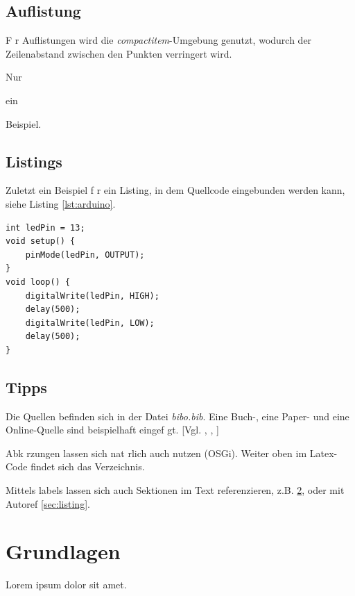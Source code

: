 \documentclass{article}
\begin{document}
\section{Auflistung}
\label{sec:auflistung}
F r Auflistungen wird die \textit{compactitem}-Umgebung genutzt, wodurch der Zeilenabstand zwischen den Punkten verringert wird.

\begin{compactitem}
	\item Nur
	\item ein
	\item Beispiel.
\end{compactitem}

\section{Listings}
\label{sec:listing}
Zuletzt ein Beispiel f r ein Listing, in dem Quellcode eingebunden werden kann, siehe Listing \ref{lst:arduino}.

\vspace{1em}
\begin{lstlisting}[caption=Arduino Beispielprogramm, label=lst:arduino]
int ledPin = 13;
void setup() {
    pinMode(ledPin, OUTPUT);
}
void loop() {
    digitalWrite(ledPin, HIGH);
    delay(500);
    digitalWrite(ledPin, LOW);
    delay(500);
}
\end{lstlisting}

\section{Tipps}
Die Quellen befinden sich in der Datei \textit{bibo.bib}. Eine Buch-, eine Paper- und eine Online-Quelle sind beispielhaft eingef gt. [Vgl. \cite{buch}, \cite{iotbds20}, \cite{online}]

Abk rzungen lassen sich nat rlich auch nutzen (\ac{OSGi}). Weiter oben im Latex-Code findet sich das Verzeichnis.

Mittels labels lassen sich auch Sektionen im Text referenzieren, z.B. \ref{sec:listing}, oder mit Autoref \autoref{sec:listing}.

\chapter{Grundlagen}
\label{chap:grundlagen}
Lorem ipsum dolor sit amet.
\end{document}
